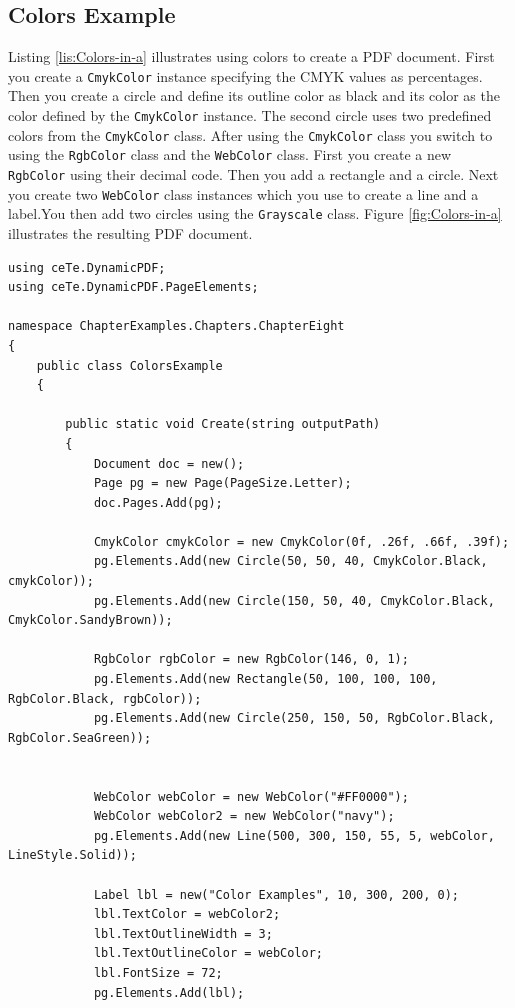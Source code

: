 \documentclass[american,letterpaper]{tufte-book}
\numberwithin{equation}{section}
\numberwithin{figure}{section}
\begin{document}
{\subsection{Colors Example}

Listing \ref{lis:Colors-in-a} illustrates using colors to create
a PDF document. First you create a \texttt{CmykColor} instance specifying the
CMYK values as percentages. Then you create a circle and define its
outline color as black and its color as the color defined by the \texttt{CmykColor}
instance. The second circle uses two predefined colors from the \texttt{CmykColor}
class. After using the \texttt{CmykColor} class you switch to using the \texttt{RgbColor}
class and the \texttt{WebColor} class. First you create a new \texttt{RgbColor} using
their decimal code. Then you add a rectangle and a circle. Next you
create two \texttt{WebColor} class instances which you use to create a line
and a label.You then add two circles using the \texttt{Grayscale} class. Figure
\ref{fig:Colors-in-a} illustrates the resulting PDF document.

\bgroup{}
\begin{lstlisting}[caption={Colors in a PDF document.},label={lis:Colors-in-a},basicstyle={\small\ttfamily},breaklines=true]
using ceTe.DynamicPDF;
using ceTe.DynamicPDF.PageElements;

namespace ChapterExamples.Chapters.ChapterEight
{
    public class ColorsExample
    {

        public static void Create(string outputPath)
        {
            Document doc = new();
            Page pg = new Page(PageSize.Letter);
            doc.Pages.Add(pg);

            CmykColor cmykColor = new CmykColor(0f, .26f, .66f, .39f);
            pg.Elements.Add(new Circle(50, 50, 40, CmykColor.Black, cmykColor));
            pg.Elements.Add(new Circle(150, 50, 40, CmykColor.Black, CmykColor.SandyBrown));

            RgbColor rgbColor = new RgbColor(146, 0, 1);
            pg.Elements.Add(new Rectangle(50, 100, 100, 100, RgbColor.Black, rgbColor));
            pg.Elements.Add(new Circle(250, 150, 50, RgbColor.Black, RgbColor.SeaGreen));

            
            WebColor webColor = new WebColor("#FF0000");
            WebColor webColor2 = new WebColor("navy");
            pg.Elements.Add(new Line(500, 300, 150, 55, 5, webColor, LineStyle.Solid));

            Label lbl = new("Color Examples", 10, 300, 200, 0);
            lbl.TextColor = webColor2;
            lbl.TextOutlineWidth = 3;
            lbl.TextOutlineColor = webColor;
            lbl.FontSize = 72;
            pg.Elements.Add(lbl);


\end{lstlisting}}
\end{document}
